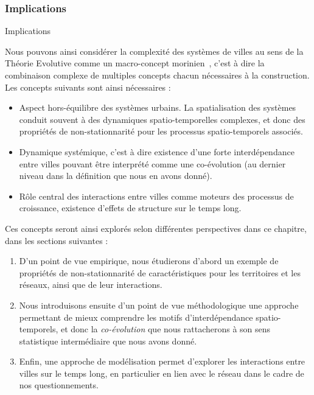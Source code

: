 \subsubsection*{Implications}{Implications}


Nous pouvons ainsi considérer la complexité des systèmes de villes au sens de la Théorie Evolutive comme un macro-concept morinien~\cite{morin1976methode}, c'est à dire la combinaison complexe de multiples concepts chacun nécessaires à la construction. Les concepts suivants sont ainsi nécessaires :
\begin{itemize}
	\item Aspect hors-équilibre des systèmes urbains. La spatialisation des systèmes conduit souvent à des dynamiques spatio-temporelles complexes, et donc des propriétés de non-stationnarité pour les processus spatio-temporels associés. %
	\item Dynamique systémique, c'est à dire existence d'une forte interdépendance entre villes pouvant être interprété comme une co-évolution (au dernier niveau dans la définition que nous en avons donné).
	\item Rôle central des interactions entre villes comme moteurs des processus de croissance, existence d'effets de structure sur le temps long.
\end{itemize}


Ces concepts seront ainsi explorés selon différentes perspectives dans ce chapitre, dans les sections suivantes :
\begin{enumerate}
	\item D'un point de vue empirique, nous étudierons d'abord un exemple de propriétés de non-stationnarité de caractéristiques pour les territoires et les réseaux, ainsi que de leur interactions.
	\item Nous introduisons ensuite d'un point de vue méthodologique une approche permettant de mieux comprendre les motifs d'interdépendance spatio-temporels, et donc la \emph{co-évolution} que nous rattacherons à son sens statistique intermédiaire que nous avons donné.
	\item Enfin, une approche de modélisation permet d'explorer les interactions entre villes sur le temps long, en particulier en lien avec le réseau dans le cadre de nos questionnements.
\end{enumerate}




\stars







